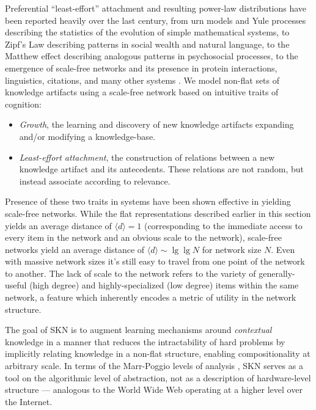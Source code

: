 \documentclass[11pt,letterpaper]{article}
\begin{document}
Preferential ``least-effort'' attachment and resulting power-law
distributions have been reported heavily over the last century, from urn
models and Yule processes describing the statistics of the evolution of
simple mathematical systems, to Zipf's Law describing patterns in social
wealth and natural language, to the Matthew effect describing analogous
patterns in psychosocial processes, to the emergence of scale-free networks
and its presence in protein interactions, linguistics, citations, and many
other systems \cite{yule25}\cite{zipf49}\cite{merton68}\cite{barabasi99}%
\cite{jeong01}\cite{cancho01}\cite{price02}.
We model non-flat sets of knowledge artifacts using a scale-free network
based on intuitive traits of cognition: 
\begin{itemize}
  \item \emph{Growth}, the learning and discovery of new knowledge artifacts
    expanding and/or modifying a knowledge-base.
  \item \emph{Least-effort attachment}, the construction of relations
    between a new knowledge artifact and its antecedents. These relations
    are not random, but instead associate according to relevance.
\end{itemize}
Presence of these two traits in systems have been shown effective in
yielding scale-free networks. While the flat representations described
earlier in this section yields an average distance of $\langle d\rangle=1$
(corresponding to the immediate access to every item in the network and an
obvious scale to the network), scale-free networks yield an average distance
of $\langle d\rangle\sim\lg\lg N$ for network size $N$. Even with massive
network sizes it's still easy to travel from one point of the network to
another. The lack of scale to the network refers to the variety of
generally-useful (high degree) and highly-specialized (low degree) items
within the same network, a feature which inherently encodes a metric of
utility in the network structure.

The goal of SKN is to augment learning mechanisms around \emph{contextual}
knowledge in a manner that reduces the intractability of hard problems by
implicitly relating knowledge in a non-flat structure, enabling
compositionality at arbitrary scale. In terms of the Marr-Poggio levels of
analysis \cite{marr78}, SKN serves as a tool on the algorithmic level of
abstraction, not as a description of hardware-level structure --- analogous
to the World Wide Web operating at a higher level over the Internet.
\end{document}
